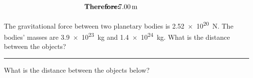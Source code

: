 \documentclass[dvipsnames]{article}
\numberwithin{equation}{section}
\numberwithin{figure}{section}
\begin{document}
\begin{align*}
    \hspace{-3.5em} & \textbf{Therefore:} & \hspace{-3em} &
    r = \SI{7.00}{m}
\end{align*}


\begin{exercise} \label{dKPTLZ}
The gravitational force between two planetary bodies is \SI{2.52e20}{N}. The bodies' masses are \SI{3.9e23}{kg} and \SI{1.4e24}{kg}. What is the distance between the objects?
\end{exercise}


\hrule

\begin{exercise} \label{zw3NbF}
What is the distance between the objects below?

\begin{center}
    \centering
\end{center}
\end{exercise}



\cyanhrule
\end{document}
